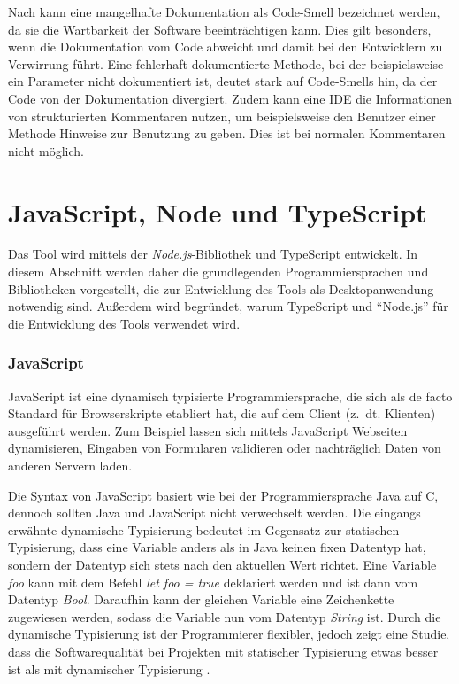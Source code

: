 Nach \cite[S.~249-250]{JavadocViolationsandTheirEvolutioninOpen-SourceSoftware} kann eine mangelhafte Dokumentation als Code-Smell bezeichnet werden, da sie die Wartbarkeit der Software beeinträchtigen kann. Dies gilt besonders, wenn die Dokumentation vom Code abweicht und damit bei den Entwicklern zu Verwirrung führt. Eine fehlerhaft dokumentierte Methode, bei der beispielsweise ein Parameter nicht dokumentiert ist, deutet stark auf Code-Smells hin, da der Code von der Dokumentation divergiert. Zudem kann eine \ac{IDE} die Informationen von strukturierten Kommentaren nutzen, um beispielsweise den Benutzer einer Methode Hinweise zur Benutzung zu geben. Dies ist bei normalen Kommentaren nicht möglich. 

\section{JavaScript, Node und TypeScript}\label{js_ts_node}
Das Tool wird mittels der \textit{Node.js}-Bibliothek und TypeScript entwickelt.
In diesem Abschnitt werden daher die grundlegenden Programmiersprachen und Bibliotheken vorgestellt, die zur Entwicklung des Tools als Desktopanwendung notwendig sind. Außerdem wird begründet, warum TypeScript und \enquote{Node.js} für die Entwicklung des Tools verwendet wird. 
\subsubsection{JavaScript}
JavaScript \cite{javascript} ist eine dynamisch typisierte Programmiersprache, die sich als de facto Standard  für Browserskripte etabliert hat, die auf dem Client (z.~dt. Klienten) ausgeführt werden. Zum Beispiel lassen sich mittels JavaScript Webseiten dynamisieren, Eingaben von Formularen validieren oder nachträglich Daten von anderen Servern laden. 

Die Syntax von JavaScript basiert wie bei der Programmiersprache Java auf C, dennoch sollten Java und JavaScript nicht verwechselt werden. Die eingangs erwähnte dynamische Typisierung bedeutet im Gegensatz zur statischen Typisierung, dass eine Variable anders als in Java keinen fixen Datentyp hat, sondern der Datentyp sich stets nach den aktuellen Wert richtet. Eine Variable \textit{foo} kann mit dem Befehl \textit{ let foo = true} deklariert werden und ist dann vom Datentyp \textit{Bool}. Daraufhin kann der gleichen Variable eine Zeichenkette zugewiesen werden, sodass die Variable nun vom Datentyp \textit{String} ist. Durch die dynamische Typisierung ist der Programmierer flexibler, jedoch zeigt eine Studie, dass die Softwarequalität bei Projekten mit statischer Typisierung etwas besser ist als mit dynamischer Typisierung \cite[S.~155ff.]{Ray2014}.

